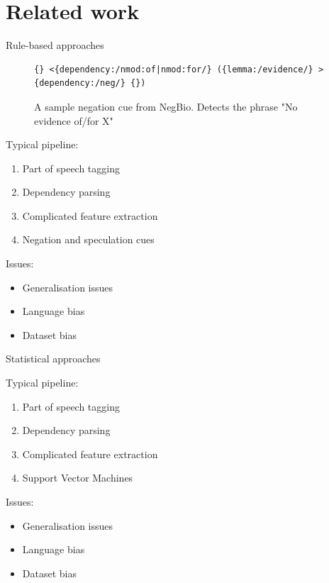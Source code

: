 \documentclass[pdf]{beamer}
\newcommand{\?}{\ensuremath{^\texttt{\bf [CITATION~NEEDED]}}}
\begin{document}
\section{Related work}

\begin{frame}[fragile]{Rule-based approaches}

\begin{figure}
\begin{center}
\tiny
\begin{BVerbatim}
{} <{dependency:/nmod:of|nmod:for/} ({lemma:/evidence/} >{dependency:/neg/} {})
\end{BVerbatim}
\end{center}
\caption{A sample negation cue from NegBio. Detects the phrase "No evidence of/for X"}
\end{figure}

Typical pipeline:

\begin{enumerate}
\item Part of speech tagging
\item Dependency parsing
\item Complicated feature extraction
\item Negation and speculation cues
\end{enumerate}

\pause

Issues:

\begin{itemize}
\item Generalisation issues
\item Language bias
\item Dataset bias
\end{itemize}


\end{frame}

\begin{frame}{Statistical approaches}
\label{sec:statistical}

Typical pipeline:

\begin{enumerate}
\item Part of speech tagging
\item Dependency parsing
\item Complicated feature extraction
\item Support Vector Machines
\end{enumerate}

\pause

Issues:

\begin{itemize}
\item Generalisation issues
\item Language bias
\item Dataset bias
\end{itemize}
\end{frame}
\end{document}
